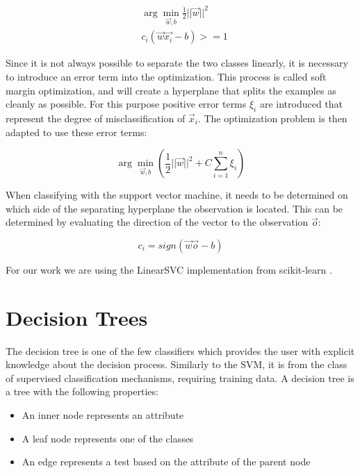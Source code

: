 \documentclass[pdftex,12pt,a4paper]{report}
\begin{document}
\begin{equation}
\label{eq:svm}
\begin{split}
& \arg\min_{\vec{w}, b} \frac{1}{2} ||\vec{w}||^2 \\
& c_i (\vec{w} \vec{x_i} - b) >= 1
\end{split}
\end{equation}

Since it is not always possible to separate the two classes linearly, it is necessary to introduce an error term into the optimization. This process is called soft margin optimization, and will create a hyperplane that splits the examples as cleanly as possible. For this purpose positive error terms $\xi_i$ are introduced that represent the degree of misclassification of $\vec{x}_i$. The optimization problem is then adapted to use these error terms:

\begin{equation}
\arg\min_{\vec{w}, b} \left(\frac{1}{2} ||\vec{w}||^2 + C \sum_{i=1}^{n} \xi_i \right)
\end{equation}

When classifying with the support vector machine, it needs to be determined on which side of the separating hyperplane the observation is located. This can be determined by evaluating the direction of the vector to the observation $\vec{o}$:

\begin{equation}
c_i = sign(\vec{w} \vec{o} - b)
\end{equation}

For our work we are using the LinearSVC implementation from scikit-learn \cite{pedregosa2011scikit}.

\section{Decision Trees}
\label{sec:basics-decision-trees}

The decision tree is one of the few classifiers which provides the user with explicit knowledge about the decision process. Similarly to the SVM, it is from the class of supervised classification mechanisms, requiring training data. A decision tree is a tree with the following properties:

\begin{itemize}
	\item An inner node represents an attribute
	\item A leaf node represents one of the classes
	\item An edge represents a test based on the attribute of the parent node
\end{itemize}
\end{document}

